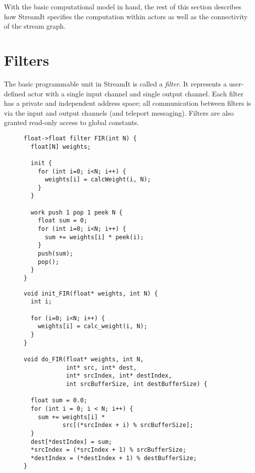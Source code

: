 With the basic computational model in hand, the rest of this section
describes how StreamIt specifies the computation within actors as well
as the connectivity of the stream graph.

\section{Filters}

The basic programmable unit in StreamIt is called a {\it filter}.  It
represents a user-defined actor with a single input channel and single
output channel.  Each filter has a private and independent address
space; all communication between filters is via the input and output
channels (and teleport messaging).  Filters are also granted read-only
access to global constants.

\begin{figure}[t]

\begin{minipage}{0.45\textwidth}
\centering
\ninepoint
\begin{verbatim}
float->float filter FIR(int N) {
  float[N] weights;

  init {
    for (int i=0; i<N; i++) {
      weights[i] = calcWeight(i, N);
    }
  }

  work push 1 pop 1 peek N {
    float sum = 0;
    for (int i=0; i<N; i++) {
      sum += weights[i] * peek(i);
    }
    push(sum);
    pop();
  }
}
\end{verbatim}
\end{minipage}
\begin{minipage}{0.55\textwidth}
\centering
\ninepoint
\begin{verbatim}
void init_FIR(float* weights, int N) {
  int i;

  for (i=0; i<N; i++) {
    weights[i] = calc_weight(i, N);
  }
}

void do_FIR(float* weights, int N,
            int* src, int* dest, 
            int* srcIndex, int* destIndex,
            int srcBufferSize, int destBufferSize) {

  float sum = 0.0;
  for (int i = 0; i < N; i++) {
    sum += weights[i] * 
           src[(*srcIndex + i) % srcBufferSize];
  }
  dest[*destIndex] = sum;
  *srcIndex = (*srcIndex + 1) % srcBufferSize;
  *destIndex = (*destIndex + 1) % destBufferSize;
}
\end{verbatim}



\end{minipage}
\end{figure}
